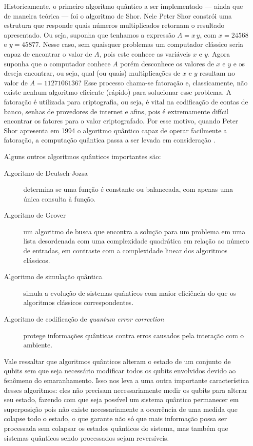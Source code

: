 Historicamente, o primeiro algoritmo quântico a ser implementado --- ainda que de maneira teórica --- foi o algoritmo de Shor. Nele Peter Shor constrói uma estrutura que responde quais números multiplicados retornam o resultado apresentado. Ou seja, suponha que tenhamos a expressão $A = x \, y$, com $x = \num{24568}$ e $y = \num{45877}$. Nesse caso, sem quaisquer problemas um computador clássico seria capaz de encontrar o valor de $A$, pois este conhece as variáveis $x$ e $y$. Agora suponha que o computador conhece $A$ porém desconhece os valores de $x$ e $y$ e os deseja encontrar, ou seja, qual (ou quais) multiplicações de $x$ e $y$ resultam no valor de $A = \num{1127106136}$? Esse processo chama-se fatoração e, classicamente, não existe nenhum algoritmo eficiente (rápido) para solucionar esse problema. A fatoração é utilizada para criptografia, ou seja, é vital na codificação de contas de banco, senhas de provedores de internet e afins, pois é extremamente difícil encontrar os fatores para o valor criptografado. Por esse motivo, quando Peter Shor apresenta em 1994 o algoritmo quântico capaz de operar facilmente a fatoração, a computação quântica passa a ser levada em consideração \cite{videoyoutube2}.

Alguns outros algoritmos quânticos importantes são:

\begin{description}
  \item[Algoritmo de Deutsch-Jozsa] determina se uma função é constante ou balanceada, com apenas uma única consulta à função.
  \item[Algoritmo de Grover] um algoritmo de busca que encontra a solução para um problema em uma lista desordenada com uma complexidade quadrática em relação ao número de entradas, em contraste com a complexidade linear dos algoritmos clássicos.
  \item[Algoritmo de simulação quântica] simula a evolução de sistemas quânticos com maior eficiência do que os algoritmos clássicos correspondentes.
  \item[Algoritmo de codificação de \textit{quantum error correction}] protege informações quânticas contra erros causados pela interação com o ambiente.
\end{description}

Vale ressaltar que algoritmos quânticos alteram o estado de um conjunto de qubits sem que seja necessário modificar todos os qubits envolvidos devido ao fenômeno do emaranhamento. Isso nos leva a uma outra importante característica desses algoritmos: eles não precisam necessariamente medir os qubits para alterar seu estado, fazendo com que seja possível um sistema quântico permanecer em superposição pois não existe necessariamente a ocorrência de uma medida que colapse todo o estado, o que garante não só que mais informação possa ser processada sem colapsar os estados quânticos do sistema, mas também que sistemas quânticos sendo processados sejam reversíveis.

